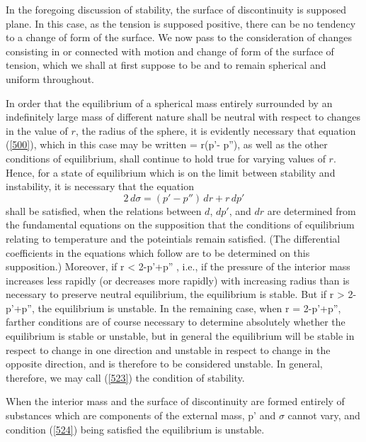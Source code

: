 \documentclass[12pt]{article}
\begin{document}
{%

In the foregoing discussion of stability, the surface of discontinuity is supposed plane. In this case, as the tension is supposed positive, there can be no tendency to a change of form of the surface. We now pass to the consideration of changes consisting in or connected with motion and change of form of the surface of tension, which we shall at first suppose to be and to remain spherical and uniform throughout.

In order that the equilibrium of a spherical mass entirely surrounded by an indefinitely large mass of different nature shall be neutral with respect to changes in the value of $r$, the radius of the sphere, it is evidently necessary that equation (\ref{500}), which in this case may be written
\sigma= r(p'- p''), \label{522} \eqe
as well as the other conditions of equilibrium, shall continue to hold true for varying values of $r$. Hence, for a state of equilibrium which is on the limit between stability and instability, it is necessary that the equation
$$ 2 \, d\sigma = (p' -p'') \, dr + r \, dp' $$
shall be satisfied, when the relations between $d$, $dp'$, and $dr$ are determined from the fundamental equations on the supposition that the conditions of equilibrium relating to temperature and the poteintials remain satisfied. (The differential coefficients in the equations which follow are to be determined on this supposition.) Moreover, if
\eqs r   < 2-p'+p'' , \label{523} \eqe
i.e., if the pressure of the interior mass increases less rapidly (or decreases more rapidly) with increasing radius than is necessary to preserve neutral equilibrium, the equilibrium is stable. But if
\eqs r   > 2-p'+p'',  \label{524} \eqe
the equilibrium is unstable. In the remaining case, when
\eqs r   = 2-p'+p'', \label{525} \eqe
farther conditions are of course necessary to determine absolutely whether the equilibrium is stable or unstable, but in general the equilibrium will be stable in respect to change in one direction and unstable in respect to change in the opposite direction, and is therefore to be considered unstable. In general, therefore, we may call (\ref{523}) the condition of stability.

When the interior mass and the surface of discontinuity are formed entirely of substances which are components of the external mass, p' and $\sigma$ cannot vary, and condition (\ref{524}) being satisfied the equilibrium is unstable.

}
\end{document}
